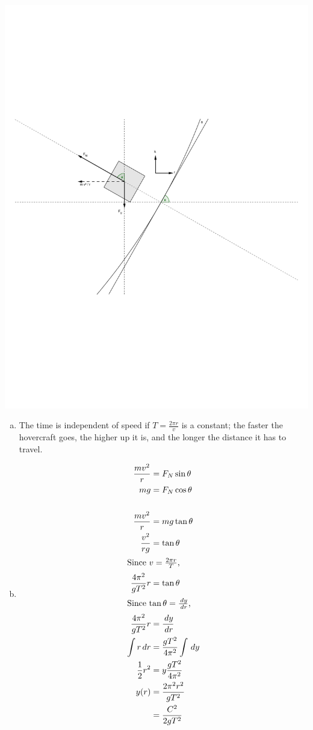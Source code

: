 \documentclass{esg8012pset}
\renewcommand{\d}{\,d}
\begin{document}
\begin{solution}
  \begin{center}\includegraphics[width=.5\textwidth]{2009-10-02_Diagram_7_2}\end{center}
  \begin{enumerate}[a)]
    \item The time is independent of speed if $T = \frac{2\pi r}{v}$ is a constant; the faster the hovercraft goes, the higher up it is, and the longer the distance it has to travel.
    \item \begin{align*}
      \frac{mv^2}{r} & = F_N\sin\theta \\
      m g & = F_N\cos\theta \\
      \\
      \frac{mv^2}{r} & = m g \tan\theta \\
      \frac{v^2}{r g} & = \tan\theta \\
      \intertext{Since $v = \frac{2\pi r}{T}$,}
      \frac{4\pi^2}{g T^2}r & = \tan\theta \\
      \intertext{Since $\tan\theta = \frac{\d y}{\d r}$,}
      \frac{4\pi^2}{g T^2}r & = \frac{\d y}{\d r} \\
      \int r \d{r} & = \frac{g T^2}{4\pi^2} \int \d y \\
      \frac{1}{2}r^2 & = y\frac{g T^2}{4\pi^2} \\
      y(r) & = \frac{2 \pi^2 r^2}{g T^2} \\
       & = \frac{C^2}{2g T^2}
    \end{align*}
  \end{enumerate}
\end{solution}
\end{document}
